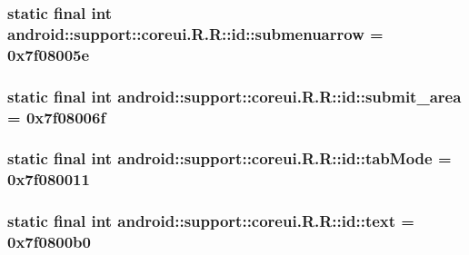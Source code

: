 \hypertarget{classandroid_1_1support_1_1coreui_1_1_r_1_1id_978ef910af8e96d18e0cc406cd2bdefd}{
\subsubsection[{submenuarrow}]{\setlength{\rightskip}{0pt plus 5cm}static final int android::support::coreui.R.R::id::submenuarrow = 0x7f08005e}}
\label{classandroid_1_1support_1_1coreui_1_1_r_1_1id_978ef910af8e96d18e0cc406cd2bdefd}


\hypertarget{classandroid_1_1support_1_1coreui_1_1_r_1_1id_05aeaa7020ee565dbee608f54e72eb2f}{
\subsubsection[{submit\_\-area}]{\setlength{\rightskip}{0pt plus 5cm}static final int android::support::coreui.R.R::id::submit\_\-area = 0x7f08006f}}
\label{classandroid_1_1support_1_1coreui_1_1_r_1_1id_05aeaa7020ee565dbee608f54e72eb2f}


\hypertarget{classandroid_1_1support_1_1coreui_1_1_r_1_1id_163b41735be26ede8966be144618cb9b}{
\subsubsection[{tabMode}]{\setlength{\rightskip}{0pt plus 5cm}static final int android::support::coreui.R.R::id::tabMode = 0x7f080011}}
\label{classandroid_1_1support_1_1coreui_1_1_r_1_1id_163b41735be26ede8966be144618cb9b}


\hypertarget{classandroid_1_1support_1_1coreui_1_1_r_1_1id_03af900cbfaef340ebe3ccd2b8c78215}{
\subsubsection[{text}]{\setlength{\rightskip}{0pt plus 5cm}static final int android::support::coreui.R.R::id::text = 0x7f0800b0}}
\label{classandroid_1_1support_1_1coreui_1_1_r_1_1id_03af900cbfaef340ebe3ccd2b8c78215}


